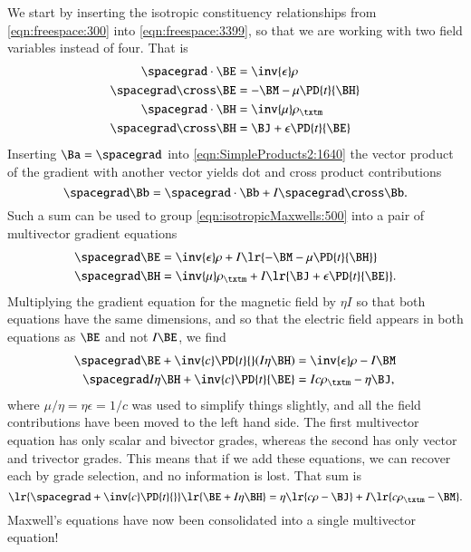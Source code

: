 We start by inserting the
isotropic
constituency relationships from \cref{eqn:freespace:300} into
\cref{eqn:freespace:3399}, so that we are working with two field variables instead of four.  That is
\begin{dmath}\label{eqn:isotropicMaxwells:500}
\begin{aligned}
\spacegrad \cdot \BE &= \inv{\epsilon} \rho \\
\spacegrad \cross \BE &= - \BM - \mu \PD{t}{\BH} \\
\spacegrad \cdot \BH &= \inv{\mu} \rho_\txtm \\
\spacegrad \cross \BH &= \BJ + \epsilon \PD{t}{\BE}
\end{aligned}
\end{dmath}
Inserting \( \Ba = \spacegrad \) into \cref{eqn:SimpleProducts2:1640} the vector product of the gradient with another vector yields dot and cross product contributions
\begin{dmath}\label{eqn:isotropicMaxwells:520}
\spacegrad \Bb = \spacegrad \cdot \Bb + I \spacegrad \cross \Bb.
\end{dmath}
Such a sum can be used to group
\cref{eqn:isotropicMaxwells:500} into a pair of
multivector gradient equations
\begin{dmath}\label{eqn:isotropicMaxwells:540}
\begin{aligned}
\spacegrad \BE &= \inv{\epsilon} \rho + I \lr{ - \BM - \mu \PD{t}{\BH} } \\
\spacegrad \BH &= \inv{\mu} \rho_\txtm + I \lr{ \BJ + \epsilon \PD{t}{\BE} }.
\end{aligned}
\end{dmath}
Multiplying the gradient equation for the magnetic field by \( \eta I \) so that both equations have the same dimensions, and so that the electric field appears in both equations as \( \BE \) and not \( I \BE \), we find
\begin{dmath}\label{eqn:isotropicMaxwells:560}
\begin{aligned}
\spacegrad \BE        + \inv{c} \PD{t}{} (I \eta \BH) &= \inv{\epsilon}\rho - I \BM  \\
\spacegrad I \eta \BH + \inv{c} \PD{t}{\BE}           &= I c \rho_\txtm - \eta \BJ,
\end{aligned}
\end{dmath}
where \( \mu/\eta = \eta \epsilon = 1/c \) was used to simplify things slightly, and all the field contributions have been moved to the left hand side.
The first multivector equation has only scalar and bivector grades, whereas the second has only vector and trivector grades.  This means that if we add these equations, we can recover each by grade selection, and no information is lost.  That sum is
\begin{dmath}\label{eqn:isotropicMaxwells:580}
\lr{ \spacegrad + \inv{c}  \PD{t}{} } \lr{ \BE + I \eta \BH } = \eta\lr{ c \rho - \BJ } + I \lr{ c \rho_\txtm - \BM }.
\end{dmath}
Maxwell's equations have now been consolidated into a single multivector equation!

